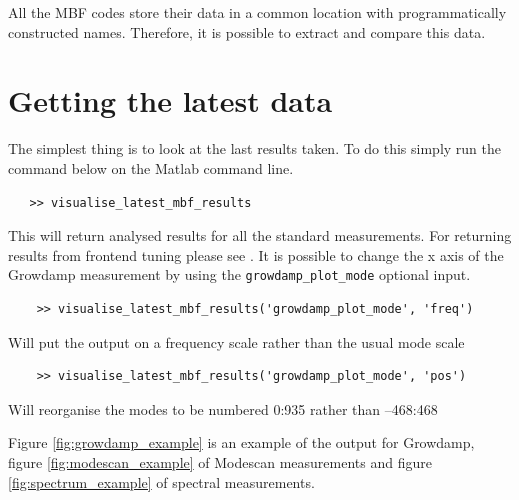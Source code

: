 \documentclass{report}
\begin{document}
All the MBF codes store their data in a common location with programmatically constructed names. Therefore, it is possible to extract and compare this data. 

\section{Getting the latest data} 

The simplest thing is to look at the last results taken. To do this simply run the command below on the Matlab command line. 
\begin{verbatim}
   >> visualise_latest_mbf_results 
\end{verbatim}
 This will return analysed results for all the standard measurements. For returning results from frontend tuning please see .
It is possible to change the x axis of the Growdamp measurement by using the  \verb+growdamp_plot_mode+ optional input.
\begin{verbatim}
    >> visualise_latest_mbf_results('growdamp_plot_mode', 'freq') 
\end{verbatim}
Will put the output on a frequency scale rather than the usual mode scale 
\begin{verbatim}
    >> visualise_latest_mbf_results('growdamp_plot_mode', 'pos') 
\end{verbatim}
Will reorganise the modes to be numbered 0:935 rather than –468:468 

Figure \ref{fig:growdamp_example} is an example of the output for Growdamp, figure \ref{fig:modescan_example} of Modescan measurements and figure \ref{fig:spectrum_example} of spectral measurements.
\end{document}
